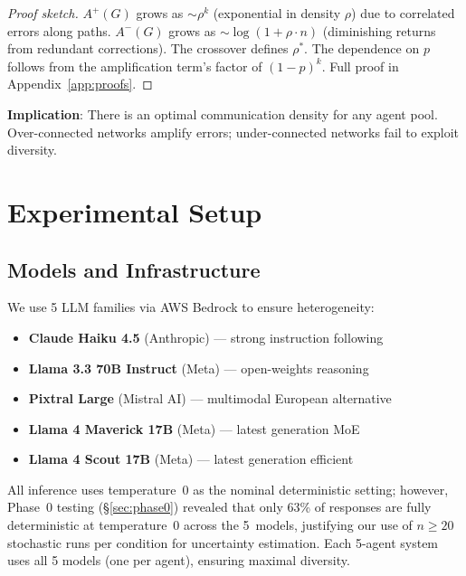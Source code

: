 \documentclass{article}
\begin{document}
\begin{proof}[Proof sketch]
$A^+(G)$ grows as $\sim \rho^k$ (exponential in density $\rho$) due to correlated errors along paths. $A^-(G)$ grows as $\sim \log(1 + \rho \cdot n)$ (diminishing returns from redundant corrections). The crossover defines $\rho^*$. The dependence on $p$ follows from the amplification term's factor of $(1-p)^k$. Full proof in Appendix~\ref{app:proofs}.
\end{proof}

\textbf{Implication}: There is an optimal communication density for any agent pool. Over-connected networks amplify errors; under-connected networks fail to exploit diversity.

\section{Experimental Setup}
\label{sec:experiments}

\subsection{Models and Infrastructure}

We use 5 LLM families via AWS Bedrock to ensure heterogeneity:
\begin{itemize}
    \item \textbf{Claude Haiku 4.5} (Anthropic) --- strong instruction following
    \item \textbf{Llama 3.3 70B Instruct} (Meta) --- open-weights reasoning
    \item \textbf{Pixtral Large} (Mistral AI) --- multimodal European alternative
    \item \textbf{Llama 4 Maverick 17B} (Meta) --- latest generation MoE
    \item \textbf{Llama 4 Scout 17B} (Meta) --- latest generation efficient
\end{itemize}

All inference uses temperature~0 as the nominal deterministic setting; however, Phase~0 testing (\S\ref{sec:phase0}) revealed that only 63\% of responses are fully deterministic at temperature~0 across the 5~models, justifying our use of $n \geq 20$ stochastic runs per condition for uncertainty estimation. Each 5-agent system uses all 5 models (one per agent), ensuring maximal diversity.
\end{document}
